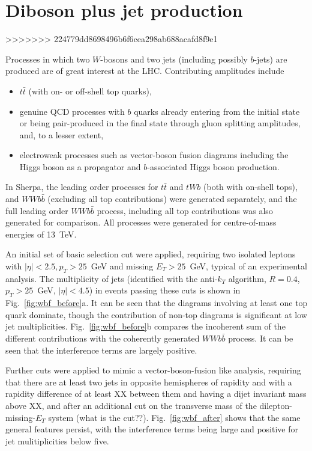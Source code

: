 \documentclass[11pt]{cernrep}
\begin{document}
\section{Diboson plus jet production}
>>>>>>> 224779dd8698496b6f6cea298ab688acafd8f9e1

Processes in which two $W$-bosons and two jets (including possibly $b$-jets) are produced are of great interest
at the LHC.  Contributing amplitudes include
\begin{itemize}
\item $t\bar{t}$ (with on- or off-shell top quarks),
\item genuine QCD processes with $b$ quarks already entering from the initial state or being
  pair-produced in the final state through gluon splitting amplitudes, and, to a lesser extent,
\item electroweak processes such as vector-boson fusion diagrams including the Higgs boson
  as a propagator and $b$-associated Higgs boson production.
\end{itemize}
In Sherpa, the leading order processes for $t\bar{t}$ and $tWb$ (both with on-shell tops), and $WWb\bar{b}$
(excluding all top contributions) were generated separately, and the full leading order $WWb\bar{b}$ process,
including all top contributions was also generated for comparison. All processes were generated for centre-of-mass
energies of 13~TeV. 

An initial set of basic selection cut were applied, requiring two isolated leptons with $|\eta| < 2.5, p_T > 25$~GeV and
missing $E_T > 25$~GeV, typical of an experimental analysis. The multiplicity of jets (identified with the anti-$k_T$
algorithm, $R=0.4$, $p_T > 25$~GeV, $|\eta| < 4.5$) in events passing these cuts is shown in Fig.~\ref{fig:wbf_before}a.
It can be seen that the diagrams involving at least one top quark dominate, though the contribution of non-top diagrams
is significant at low jet multiplicities.  Fig.~\ref{fig:wbf_before}b compares the incoherent sum of the different
contributions with the coherently generated $WWb\bar{b}$ process. It can be seen that the interference terms are largely
positive.

Further cuts were applied to mimic a vector-boson-fusion like analysis, requiring that there are at least two jets in
opposite hemispheres of rapidity and with a rapidity difference of at least XX between them and having a dijet invariant
mass above XX, and after an additional cut on the transverse mass of the dilepton-missing-$E_T$ system (what is the cut??).
Fig.~\ref{fig:wbf_after} shows that the same general features persist, with the interference terms being large and
positive for jet mulitiplicities below five.
\end{document}
